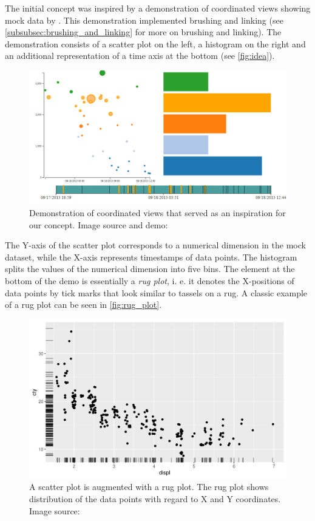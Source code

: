 The initial concept was inspired by a demonstration of coordinated views showing mock data by \cite{Johnson2018}.
This demonstration implemented brushing and linking (see \autoref{subsubsec:brushing_and_linking} for more on brushing and linking).
The demonstration consists of a scatter plot on the left, a histogram on the right and an additional representation of a time axis at the bottom (see \autoref{fig:idea}).

\begin{figure}[!]
\centering
\includegraphics[width=\textwidth]{img/idea}
\caption{Demonstration of coordinated views that served as an inspiration for our concept. Image source and demo: \cite{Johnson2018}}
\label{fig:idea}
\end{figure}

The Y-axis of the scatter plot corresponds to a numerical dimension in the mock dataset, while the X-axis represents timestamps of data points.
The histogram splits the values of the numerical dimension into five bins.
The element at the bottom of the demo is essentially a \textit{rug plot}, i. e. it denotes the X-positions of data points by tick marks that look similar to tassels on a rug.
A classic example of a rug plot can be seen in \autoref{fig:rug_plot}.

\begin{figure}[!]
\centering
\includegraphics[width=\textwidth]{img/rug_plot}
\caption{A scatter plot is augmented with a rug plot. The rug plot shows distribution of the data points with regard to X and Y coordinates. Image source: \cite{rug}}
\label{fig:rug_plot}
\end{figure}

